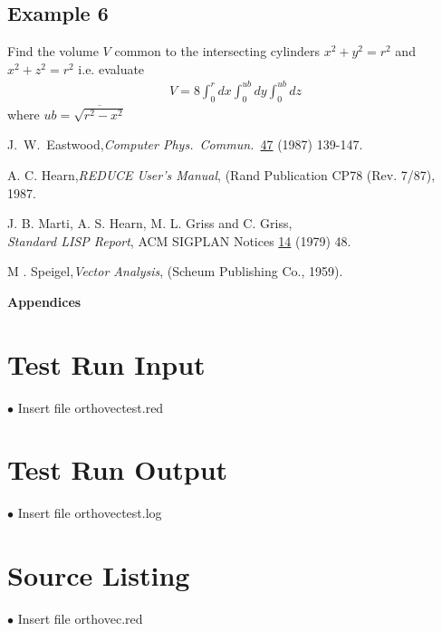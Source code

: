 \subsection{Example 6}

Find the volume $V$ common to the intersecting cylinders $x^2 + y^2 
= r^2$ and $x^2 + z^2 = r^2$ i.e. evaluate
\begin{eqnarray*}
V = 8 \int^r_0 dx \int^{ub}_0 dy \int^{ub}_0 dz
\end{eqnarray*}
where $ub = \overline{\sqrt { r^2 - x^2}}$

\begin{thebibliography}{9}

 J.~W.~Eastwood,{\em Computer Phys.~Commun.~}\underline{47} 
(1987) 139-147.

 A. C. Hearn,{\em REDUCE User's Manual}, 
(Rand Publication CP78 (Rev. 7/87), 1987.

 J. B. Marti, A. S. Hearn, M. L. Griss and C. Griss,\\
{\em Standard LISP Report}, 
ACM SIGPLAN Notices \underline{14} (1979) 48.

 M . Speigel,{\em Vector Analysis}, (Scheum Publishing Co., 
1959).

\end{thebibliography}

\newpage
\appendix
\begin{center}
{\Large{\bf Appendices}}
\end{center}
\section {Test Run Input}
$\bullet$ Insert file orthovectest.red

\section {Test Run Output}
$\bullet$ Insert file orthovectest.log

\section {Source Listing}
$\bullet$ Insert file orthovec.red


